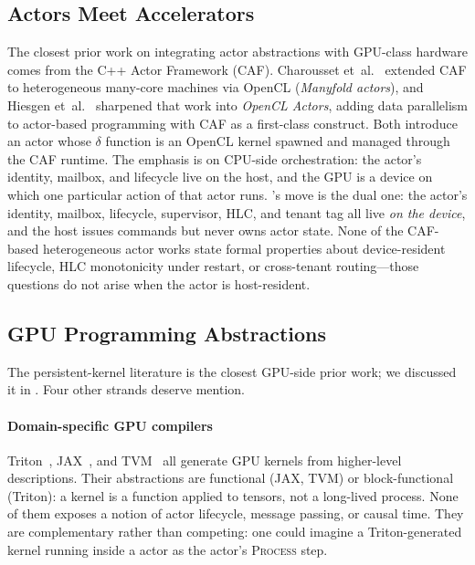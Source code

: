 \subsection{Actors Meet Accelerators}
\label{sec:rw:hetero-actors}

The closest prior work on integrating actor abstractions with
GPU-class hardware comes from the C++ Actor Framework (CAF).
Charousset et~al.~\citep{charousset2016manyfold} extended CAF to
heterogeneous many-core machines via OpenCL (\emph{Manyfold actors}),
and Hiesgen et~al.~\citep{hiesgen2018opencl} sharpened that work
into \emph{OpenCL Actors}, adding data parallelism to actor-based
programming with CAF as a first-class construct.  Both introduce
an actor whose \(\delta\) function is an OpenCL kernel spawned and
managed through the CAF runtime.  The emphasis is on CPU-side
orchestration: the actor's identity, mailbox, and lifecycle live
on the host, and the GPU is a device on which one particular
action of that actor runs.  \system{}'s move is the dual one: the
actor's identity, mailbox, lifecycle, supervisor, HLC, and tenant
tag all live \emph{on the device}, and the host issues commands
but never owns actor state.  None of the CAF-based heterogeneous
actor works state formal properties about device-resident
lifecycle, HLC monotonicity under restart, or cross-tenant
routing—those questions do not arise when the actor is
host-resident.

\subsection{GPU Programming Abstractions}
\label{sec:rw:gpu}

The persistent-kernel literature
\citep{aila2009raytrace,gupta2012persistent,steinberger2014whippletree}
is the closest GPU-side prior work; we discussed it in
.  Four other strands deserve mention.

\paragraph{Domain-specific GPU compilers}
Triton~\citep{tillet2019triton}, JAX~\citep{jax2018}, and
TVM~\citep{chen2018tvm} all generate GPU kernels from higher-level
descriptions.  Their abstractions are functional (JAX, TVM) or
block-functional (Triton): a kernel is a function applied to
tensors, not a long-lived process.  None of them exposes a notion
of actor lifecycle, message passing, or causal time.  They are
complementary rather than competing: one could imagine a
Triton-generated kernel running inside a \system{} actor as the
actor's \textsc{Process} step.

